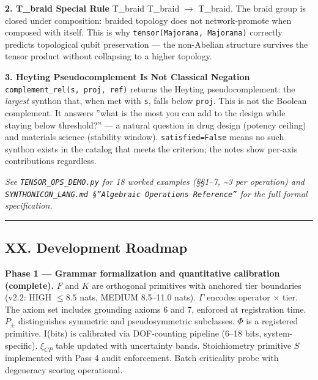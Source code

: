 \documentclass[12pt,a4paper]{article}
\begin{document}
\textbf{2. T\_braid Special Rule}
T\_braid \otimes T\_braid $\rightarrow$ T\_braid. The braid group is closed under composition: braided topology does not network-promote when composed with itself. This is why \texttt{tensor(Majorana, Majorana)} correctly predicts topological qubit preservation --- the non-Abelian structure survives the tensor product without collapsing to a higher topology.

\textbf{3. Heyting Pseudocomplement Is Not Classical Negation}
\texttt{complement\_rel(s, proj, ref)} returns the Heyting pseudocomplement: the \emph{largest} synthon that, when met with \texttt{s}, falls below \texttt{proj}. This is not the Boolean complement. It answers ''what is the most you can add to the design while staying below threshold?'' --- a natural question in drug design (potency ceiling) and materials science (stability window). \texttt{satisfied=False} means no such synthon exists in the catalog that meets the criterion; the notes show per-axis contributions regardless.

\emph{See \texttt{TENSOR\_OPS\_DEMO.py} for 18 worked examples (§§1--7, \textasciitilde{}3 per operation) and \texttt{SYNTHONICON\_LANG.md §''Algebraic Operations Reference''} for the full formal specification.}

\begin{center}
\rule{0.5\textwidth}{0.4pt}
\end{center}

\subsection{XX. Development Roadmap}

\textbf{Phase 1 --- Grammar formalization and quantitative calibration (complete).} $F$ and $K$ are orthogonal primitives with anchored tier boundaries (v2.2: HIGH $\leq 8.5$ nats, MEDIUM 8.5--11.0 nats). $\Gamma$ encodes operator $\times$ tier. The axiom set includes grounding axioms 6 and 7, enforced at registration time. $P_{\pm}$ distinguishes symmetric and pseudosymmetric subclasses. $\Phi$ is a registered primitive. I(bits) is calibrated via DOF-counting pipeline (6--18 bits, system-specific). $\xi_{CP}$ table updated with uncertainty bands. Stoichiometry primitive $S$ implemented with Pass 4 audit enforcement. Batch criticality probe with degeneracy scoring operational.
\end{document}
